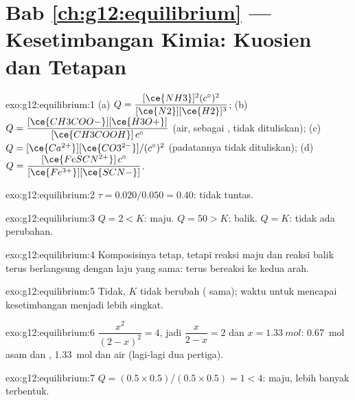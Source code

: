 \section*{Bab \ref{ch:g12:equilibrium} --- Kesetimbangan Kimia: Kuosien dan Tetapan}

\begin{solution}{exo:g12:equilibrium:1}
(a) $Q = \dfrac{[\ce{NH3}]^2 (c^\circ)^2}{[\ce{N2}][\ce{H2}]^3}$;
(b) $Q = \dfrac{[\ce{CH3COO-}][\ce{H3O+}]}{[\ce{CH3COOH}]\,c^\circ}$ (air,
sebagai , tidak dituliskan);
(c) $Q = [\ce{Ca^{2+}}][\ce{CO3^{2-}}]/(c^\circ)^2$ (padatannya tidak
dituliskan);
(d) $Q = \dfrac{[\ce{FeSCN^{2+}}]\,c^\circ}{[\ce{Fe^{3+}}][\ce{SCN-}]}$.
\end{solution}

\begin{solution}{exo:g12:equilibrium:2}
$\tau = 0.020/0.050 = 0.40$: tidak tuntas.
\end{solution}

\begin{solution}{exo:g12:equilibrium:3}
$Q = 2 < K$: maju. $Q = 50 > K$: balik. $Q = K$: tidak ada perubahan.
\end{solution}

\begin{solution}{exo:g12:equilibrium:4}
Komposisinya tetap, tetapi reaksi maju dan reaksi balik terus
berlangsung dengan laju yang sama:  terus bereaksi ke
kedua arah.
\end{solution}

\begin{solution}{exo:g12:equilibrium:5}
Tidak, $K$ tidak berubah ( sama); waktu untuk mencapai
kesetimbangan menjadi lebih singkat.
\end{solution}

\begin{solution}{exo:g12:equilibrium:6}
$\dfrac{x^2}{(2-x)^2} = 4$, jadi $\dfrac{x}{2-x} = 2$ dan
$x = \qty{1.33}{mol}$: \qty{0.67}{mol} asam dan ,
\qty{1.33}{mol}  dan air (lagi-lagi dua pertiga).
\end{solution}

\begin{solution}{exo:g12:equilibrium:7}
$Q = (0.5 \times 0.5)/(0.5 \times 0.5) = 1 < 4$: maju, lebih banyak
 terbentuk.
\end{solution}

